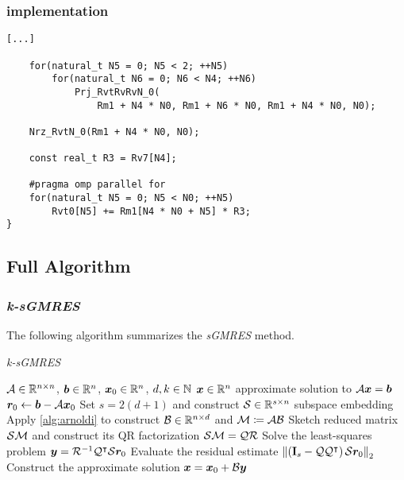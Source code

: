 \begin{frame}[fragile] %
    \frametitle{implementation}

\begin{lstlisting}[style=cpp]
    [...]

    for(natural_t N5 = 0; N5 < 2; ++N5)
        for(natural_t N6 = 0; N6 < N4; ++N6)
            Prj_RvtRvRvN_0(
                Rm1 + N4 * N0, Rm1 + N6 * N0, Rm1 + N4 * N0, N0);

    Nrz_RvtN_0(Rm1 + N4 * N0, N0);

    const real_t R3 = Rv7[N4];

    #pragma omp parallel for
    for(natural_t N5 = 0; N5 < N0; ++N5)
        Rvt0[N5] += Rm1[N4 * N0 + N5] * R3;
}
\end{lstlisting}

\end{frame}

\subsection{Full Algorithm}

\begin{frame}[fragile]
    \frametitle{\textit{k-sGMRES}}

    The following algorithm summarizes the \textit{sGMRES} method.

    \begin{algorithm}[H]
    \caption{\textit{k-sGMRES}} \label{alg:sgmres}
    \begin{algorithmic}
    \Require $\mathcal{A} \in \mathbb{R}^{n \times n}$, $\bm{b} \in \mathbb{R}^{n}$, $\bm{x}_0 \in \mathbb{R}^{n}$, $d, k \in \mathbb{N}$
    \Ensure $\bm{x} \in \mathbb{R}^{n}$ approximate solution to $\mathcal{A} \bm{x} = \bm{b}$
    \State $\bm{r}_0 \gets \bm{b} - \mathcal{A} \bm{x}_0$
    \State Set $s = 2 (d + 1)$ and construct $\mathcal{S} \in \mathbb{R}^{s \times n}$ subspace embedding
    \State Apply \cref{alg:arnoldi} to construct $\mathcal{B} \in \mathbb{R}^{n \times d}$ and $\mathcal{M} \coloneqq \mathcal{A} \mathcal{B}$
    \State Sketch reduced matrix $\mathcal{S} \mathcal{M}$ and construct its QR factorization $\mathcal{S} \mathcal{M} = \mathcal{Q} \mathcal{R}$
    \State Solve the least-squares problem $\bm{y} = \mathcal{R}^{-1} \mathcal{Q}^{\intercal} \mathcal{S} \bm{r}_0$
    \State Evaluate the residual estimate $\left\lVert  \left( \mathbf{I}_s - \mathcal{Q} \mathcal{Q}^{\intercal} \right) \mathcal{S} \bm{r}_0  \right\rVert_2$
    \State Construct the approximate solution $\bm{x} = \bm{x}_0 + \mathcal{B} \bm{y}$
    \end{algorithmic}
    \end{algorithm}

\end{frame}
